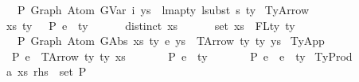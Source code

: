 \begin{isabellebody}
\ \ \ \ \ {\isasymGamma}\ {\isasymturnstile}{\isacharbraceleft}{\kern0pt}P{\isacharbraceright}{\kern0pt}\ Graph\ {\isacharparenleft}{\kern0pt}Atom\ {\isacharparenleft}{\kern0pt}GVar\ i{\isacharparenright}{\kern0pt}\ ys{\isacharparenright}{\kern0pt}\ {\isacharcolon}{\kern0pt}\ lmap{\isacharunderscore}{\kern0pt}ty\ {\isacharparenleft}{\kern0pt}lsubst\ s{\isacharparenright}{\kern0pt}\ ty{\isachardoublequoteclose}\isanewline
{\isacharbar}{\kern0pt}\ TyArrow{\isacharcolon}{\kern0pt}\isanewline
\ \ \ \ {\isachardoublequoteopen}{\isacharparenleft}{\kern0pt}xs{\isacharcomma}{\kern0pt}\ ty{}{\isacharparenright}{\kern0pt}\ {\isacharhash}{\kern0pt}\ {\isasymGamma}\ {\isasymturnstile}{\isacharbraceleft}{\kern0pt}P{\isacharbraceright}{\kern0pt}\ e\ {\isacharcolon}{\kern0pt}\ ty{}\ {\isacharequal}{\kern0pt}{\isacharequal}{\kern0pt}{\isachargreater}{\kern0pt}\isanewline
\ \ \ \ \ distinct\ xs\ {\isacharequal}{\kern0pt}{\isacharequal}{\kern0pt}{\isachargreater}{\kern0pt}\isanewline
\ \ \ \ \ set\ xs\ {\isacharequal}{\kern0pt}\ FLty\ ty{}\ {\isacharequal}{\kern0pt}{\isacharequal}{\kern0pt}{\isachargreater}{\kern0pt}\isanewline
\ \ \ \ \ {\isasymGamma}\ {\isasymturnstile}{\isacharbraceleft}{\kern0pt}P{\isacharbraceright}{\kern0pt}\ Graph\ {\isacharparenleft}{\kern0pt}Atom\ {\isacharparenleft}{\kern0pt}GAbs\ xs\ ty{}\ e{\isacharparenright}{\kern0pt}\ ys{\isacharparenright}{\kern0pt}\ {\isacharcolon}{\kern0pt}\ TArrow\ ty{}\ ty{}\ ys{\isachardoublequoteclose}\isanewline
{\isacharbar}{\kern0pt}\ TyApp{\isacharcolon}{\kern0pt}\isanewline
\ \ \ \ {\isachardoublequoteopen}{\isasymGamma}\ {\isasymturnstile}{\isacharbraceleft}{\kern0pt}P{\isacharbraceright}{\kern0pt}\ e{}\ {\isacharcolon}{\kern0pt}\ TArrow\ ty{}\ ty{}\ xs\ {\isacharequal}{\kern0pt}{\isacharequal}{\kern0pt}{\isachargreater}{\kern0pt}\isanewline
\ \ \ \ \ {\isasymGamma}\ {\isasymturnstile}{\isacharbraceleft}{\kern0pt}P{\isacharbraceright}{\kern0pt}\ e{}\ {\isacharcolon}{\kern0pt}\ ty{}\ {\isacharequal}{\kern0pt}{\isacharequal}{\kern0pt}{\isachargreater}{\kern0pt}\isanewline
\ \ \ \ \ {\isasymGamma}\ {\isasymturnstile}{\isacharbraceleft}{\kern0pt}P{\isacharbraceright}{\kern0pt}\ e{}\ {\isasymcdot}\ e{}\ {\isacharcolon}{\kern0pt}\ ty{}{\isachardoublequoteclose}\isanewline
{\isacharbar}{\kern0pt}\ TyProd{\isacharcolon}{\kern0pt}\isanewline
\ \ \ \ {\isachardoublequoteopen}{\isacharparenleft}{\kern0pt}{\isacharparenleft}{\kern0pt}a{\isacharcomma}{\kern0pt}\ xs{\isacharparenright}{\kern0pt}{\isacharcomma}{\kern0pt}\ rhs{\isacharparenright}{\kern0pt}\ {\isasymin}\ set\ P\ {\isacharequal}{\kern0pt}{\isacharequal}{\kern0pt}{\isachargreater}{\kern0pt}\isanewline

\end{isabellebody}
